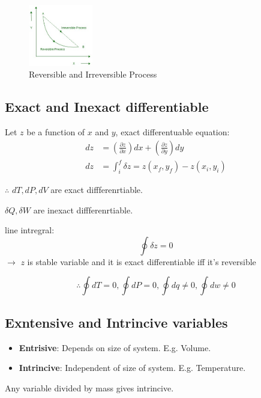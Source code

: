 \documentclass[fleqn,10pt]{SelfArx} %
\begin{document}
\begin{figure}[ht]
    \begin{center}
        \includegraphics[width=0.25\textwidth]{Figures/Rev_irr_process.jpg}
    \end{center}
    \caption{Reversible and Irreversible Process}\label{fig:Rev_irr_process}
\end{figure}

\subsection{Exact and Inexact differentiable}
Let $z$ be a function of $x$ and $y$, exact differentuable equation:
\begin{align}
    dz &= \left(\frac{\partial z}{\partial x}\right) dx + \left(\frac{\partial z}{\partial y}\right) dy \\
    dz &= \int_i^f \delta z = z(x_f,y_f) - z(x_i,y_i)
\end{align}

$\therefore$ $dT,dP,dV$ are exact diffferenrtiable.

$\delta Q, \delta W$ are inexact diffferenrtiable.

line intregral:
$$
\oint \delta z = 0
$$
$\rightarrow$ $z$ is stable variable and it is exact differentiable iff it's reversible

$$
\therefore \oint dT = 0, \oint dP = 0, \oint dq \neq 0, \oint dw \neq 0 
$$

\subsection{Exntensive and Intrincive variables}
\begin{itemize}[noitemsep]
    \item \textbf{Entrisive}: Depends on size of system. E.g. Volume.
    \item \textbf{Intrincive}: Independent of size of system. E.g. Temperature.
\end{itemize}

Any variable divided by mass gives intrincive.
\end{document}
